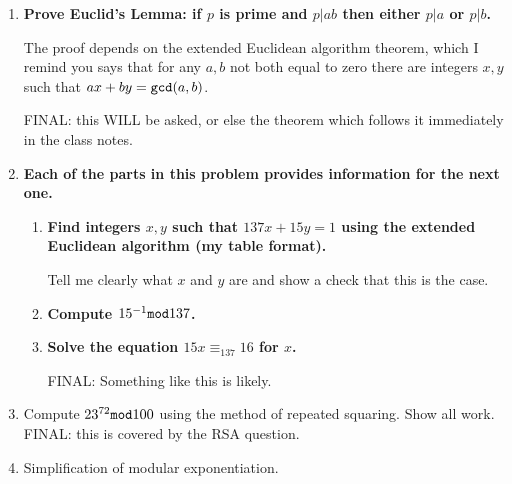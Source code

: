\documentclass[12pt]{article}
\begin{document}
\begin{enumerate}
\newpage

\item   {\bf Prove Euclid's Lemma:  if $p$ is prime and $p|ab$ then either $p|a$ or $p|b$.  

The proof depends on the extended Euclidean algorithm theorem, which I remind you says that for any $a,b$ not both equal to zero there are integers $x,y$ such that $ax+by = {\tt gcd}(a,b)$.}  FINAL:  this WILL be asked, or else the theorem which follows it immediately in the class notes.

\newpage

\item  {\bf Each of the parts in this problem provides information for the next one.}
\begin{enumerate}
\item {\bf Find integers $x,y$ such that $137x + 15y = 1$ using the extended Euclidean algorithm (my table format).

Tell me clearly what $x$ and $y$ are and show a check that this is the case.}

\vspace{3 in}

\item {\bf Compute $15^{-1} {\tt mod} 137$. }

\vspace{.5 in}

\item {\bf Solve the equation $15x \equiv_{137} 16$ for $x$.}

FINAL:  Something like this is likely.

\end{enumerate}

\newpage

\item  Compute $23^{72}{\tt mod} 100$ using the method of repeated squaring.  Show all work.  FINAL:  this is covered by the RSA question.

\newpage

\item  Simplification of modular exponentiation.  

\end{enumerate}
\end{document}
